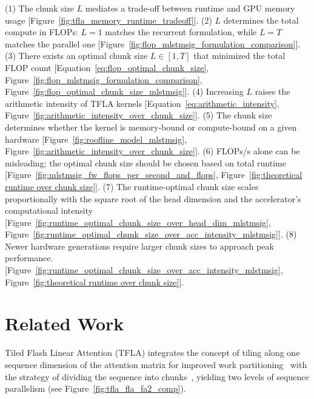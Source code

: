 \documentclass{article}
\begin{document}
        (1) The chunk size $L$ mediates a trade-off between runtime and GPU memory usage [Figure~\ref{fig:tfla_memory_runtime_tradeoff}].
        (2) $L$ determines the total compute in FLOPs: $L=1$ matches the recurrent formulation, while $L=T$ matches the parallel one [Figure~\ref{fig:flop_mlstmsig_formulation_comparison}].
        (3) There exists an optimal chunk size $L \in [1, T]$ that minimized the total FLOP count
        [Equation~\eqref{eq:flop_optimal_chunk_size}, Figure~\ref{fig:flop_mlstmsig_formulation_comparison}, Figure~\ref{fig:flop_optimal_chunk_size_mlstmsig}].
        (4) Increasing $L$ raises the arithmetic intensity of TFLA kernels [Equation~\eqref{eq:arithmetic_intensity}, Figure~\ref{fig:arithmetic_intensity_over_chunk_size}].
        (5) The chunk size determines whether the kernel is memory-bound or compute-bound on a given hardware [Figure~\ref{fig:roofline_model_mlstmsig}, Figure~\ref{fig:arithmetic_intensity_over_chunk_size}].
        (6) FLOPs/s alone can be misleading; the optimal chunk size should be chosen based on total runtime [Figure~\ref{fig:mlstmsig_fw_flops_per_second_and_flops}, Figure~\ref{fig:theoretical runtime over chunk size}].
        (7) The runtime-optimal chunk size scales proportionally with the square root of the head dimension and the accelerator’s computational intensity         [Figure~\ref{fig:runtime_optimal_chunk_size_over_head_dim_mlstmsig}, Figure~\ref{fig:runtime_optimal_chunk_size_over_acc_intensity_mlstmsig}].
        (8) Newer hardware generations require larger chunk sizes to approach peak performance. [Figure~\ref{fig:runtime_optimal_chunk_size_over_acc_intensity_mlstmsig}, Figure~\ref{fig:theoretical runtime over chunk size}].
\section{Related Work}
\label{sec:related_work}
Tiled Flash Linear Attention (TFLA) integrates the concept of tiling along one sequence dimension of the attention matrix for improved work partitioning~\citep{dao:23flashattention2} with the strategy of dividing the sequence into chunks~\citep{yang:24gated}, yielding two levels of sequence parallelism (see Figure~\ref{fig:tfla_fla_fa2_comp}).
\end{document}
